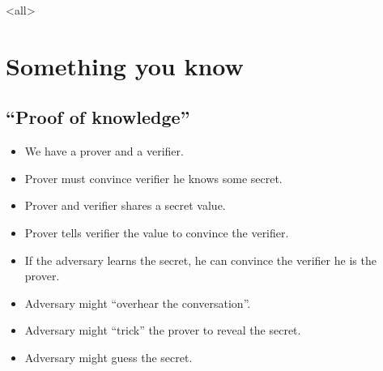 \mode*

\mode<all>{}


\section{Something you know}

\subsection{\enquote{Proof of knowledge}}

\begin{frame}
  \begin{idea}
    \begin{itemize}
      \item We have a prover and a verifier.
      \item Prover must convince verifier he knows some 
        secret.
    \end{itemize}
  \end{idea}

  \begin{idea}[Password]
    \begin{itemize}
      \item Prover and verifier shares a secret value.

      \item Prover tells verifier the value to convince the verifier.
    \end{itemize}
  \end{idea}
\end{frame}

\begin{frame}
  \begin{remark}
    \begin{itemize}
      \item If the adversary learns the secret, he can convince the verifier he 
        is the prover.
    \end{itemize}
  \end{remark}

  \begin{example}
    \begin{itemize}
      \item Adversary might \enquote{overhear the conversation}.
      \item Adversary might \enquote{trick} the prover to reveal the secret.
      \item Adversary might guess the secret.
    \end{itemize}
  \end{example}
\end{frame}

